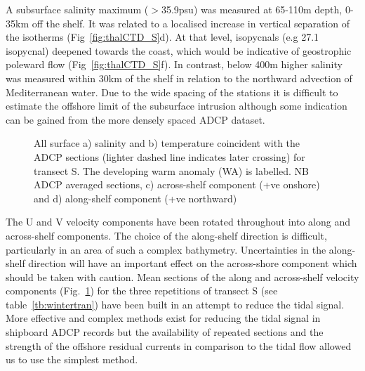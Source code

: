 A subsurface salinity maximum ($>$35.9psu) was measured at 65-110m
depth, 0-35km off the shelf. It was related to a localised
increase in vertical separation of the isotherms
(Fig~\ref{fig:thalCTD_S}d). At that level, isopycnals (e.g 27.1
isopycnal) deepened towards the coast, which would be indicative
of geostrophic poleward flow (Fig~\ref{fig:thalCTD_S}f). In
contrast, below 400m higher salinity was measured within 30km of
the shelf in relation to the northward advection of Mediterranean
water. Due to the wide spacing of the stations it is difficult to
estimate the offshore limit of the subsurface intrusion although
some indication can be gained from the more densely spaced ADCP
dataset.
\begin{figure}[t]
\arribacap \centering %
\hspace*{0.4cm}
\quad%
%
%
\caption{All surface a) salinity and b) temperature coincident
with the ADCP sections (lighter dashed line indicates later
crossing) for transect S. The developing warm anomaly (WA) is
labelled. NB ADCP averaged sections, c) across-shelf component
(+ve onshore) and d) along-shelf component (+ve northward)}
\label{fig:thalADCP_S}
\end{figure}

The U and V velocity components have been rotated throughout into
along and across-shelf components. The choice of the along-shelf
direction is difficult, particularly in an area of such a complex
bathymetry. Uncertainties in the along-shelf direction will have
an important effect on the across-shore component which should be
taken with caution. Mean sections of the along and across-shelf
velocity components (Fig.~\ref{fig:thalADCP_S}) for the three
repetitions of transect S (see table~\ref{tb:wintertran}) have
been built in an attempt to reduce the tidal signal. More
effective and complex methods exist for reducing the tidal signal
in shipboard ADCP records
\citep[e.g.][]{Candela92,Howarth92,Munchow00a} but the
availability of repeated sections and the strength of the offshore
residual currents in comparison to the tidal flow
\citep[$\sim$8\velc,][]{Fanjul97} allowed us to use the simplest
method.

